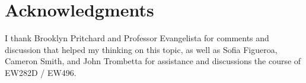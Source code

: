 \documentclass[10pt]{article}
\begin{document}


\section{Acknowledgments}
I thank Brooklyn Pritchard and Professor Evangelista for comments and discussion that helped my thinking on this topic, as well as Sofia Figueroa, Cameron Smith, and John Trombetta for assistance and discussions the course of EW282D / EW496.



\clearpage
\appendix 
\renewcommand{\figurename}{Supplementary Figure}
\renewcommand{\thefigure}{S\arabic{figure}}
\end{document}
